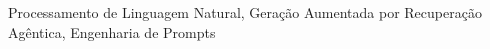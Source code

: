 \glsresetall

\noindent Processamento de Linguagem Natural, Geração Aumentada por Recuperação Agêntica, Engenharia de Prompts




